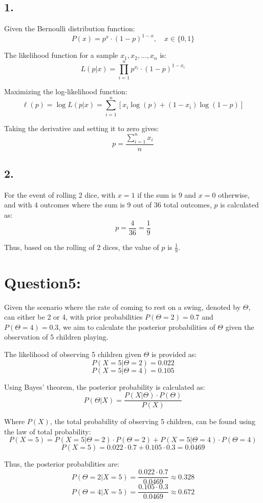 \documentclass{article}
\begin{document}
\subsection*{1.}
Given the Bernoulli distribution function:
\[ P(x) = p^x \cdot (1 - p)^{1-x}, \quad x \in \{0, 1\} \]

The likelihood function for a sample \(x_1, x_2, ..., x_n\) is:
\[ L(p|x) = \prod_{i=1}^{n} p^{x_i} \cdot (1 - p)^{1-x_i} \]

Maximizing the log-likelihood function:
\[ \ell(p) = \log L(p|x) = \sum_{i=1}^{n} \left[ x_i \log(p) + (1 - x_i) \log(1 - p) \right] \]

Taking the derivative and setting it to zero gives:
\[ p = \frac{\sum_{i=1}^{n} x_i}{n} \]

\subsection*{2.}

For the event of rolling 2 dice, with \(x = 1\) if the sum is 9 and \(x = 0\) otherwise, and with 4 outcomes where the sum is 9 out of 36 total outcomes, \(p\) is calculated as:
\[ p = \frac{4}{36} = \frac{1}{9} \]

Thus, based on the rolling of 2 dices, the value of \(p\) is \(\frac{1}{9}\).

\section{Question5:}
Given the scenario where the rate of coming to rest on a swing, denoted by $\Theta$, can either be 2 or 4, with prior probabilities $P(\Theta = 2) = 0.7$ and $P(\Theta = 4) = 0.3$, we aim to calculate the posterior probabilities of $\Theta$ given the observation of 5 children playing.

The likelihood of observing 5 children given $\Theta$ is provided as:
\[ P(X = 5 | \Theta = 2) = 0.022 \]
\[ P(X = 5 | \Theta = 4) = 0.105 \]

Using Bayes' theorem, the posterior probability is calculated as:
\[ P(\Theta | X) = \frac{P(X | \Theta) \cdot P(\Theta)}{P(X)} \]

Where $P(X)$, the total probability of observing 5 children, can be found using the law of total probability:
\[ P(X = 5) = P(X = 5 | \Theta = 2) \cdot P(\Theta = 2) + P(X = 5 | \Theta = 4) \cdot P(\Theta = 4) \]
\[ P(X = 5) = 0.022 \cdot 0.7 + 0.105 \cdot 0.3 = 0.0469 \]

Thus, the posterior probabilities are:
\[ P(\Theta = 2 | X = 5) = \frac{0.022 \cdot 0.7}{0.0469} \approx 0.328 \]
\[ P(\Theta = 4 | X = 5) = \frac{0.105 \cdot 0.3}{0.0469} \approx 0.672 \]
\end{document}
